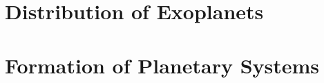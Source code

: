 \documentclass{momento}
\begin{document}


\onecolumn
\chapter{Distribution of Exoplanets}
\label{cha:distr-exopl}

\twocolumn

\chapter{Formation of Planetary Systems}
\label{cha:form-plan-syst}



\appendices




\nocite{*}
\end{document}
